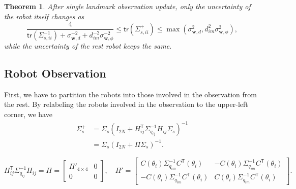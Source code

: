 \documentclass[xcolor=x11names]{article}
\DeclareMathOperator\T{\mathsf{T}}
\newtheorem{theorem}{Theorem}
\begin{document}
    
\begin{theorem}
   After single landmark observation update, only the uncertainty of the robot itself changes as
   \[
    \frac{4}{\mathsf{tr}\left(  \Sigma_{s,ii}^{-1}\right) + \sigma^{-2}_{\mathbf{w},d} + d_{im}^{-2} \sigma^{-2}_{\mathbf{w},\phi}}  \leq \mathsf{tr}\left({\Sigma_{s,ii}^+}  \right) \leq  \max(\sigma^2_{\mathbf{w},d},d_{im}^2 \sigma^2_{\mathbf{w},\phi}),
   \]
   while the uncertainty of the rest robot keeps the same.
\end{theorem}    
    
    
\subsection{Robot Observation}    
    
   First, we have to partition the robots into those involved in the observation from the rest. By relabeling the robots involved in the observation to the upper-left corner, we have
   \begin{align*}
      \Sigma^{+}_s &= \Sigma_s \left( I_{2N} + H_{ij}^{\T} \Sigma_{q_{ij}}^{-1} H_{ij} \Sigma_s   \right)^{-1}\\
          &= \Sigma_s \left( I_{2N} + \Pi \Sigma_s   \right)^{-1}.
   \end{align*}
   
    \begin{equation}
       H_{ij}^{\T} \Sigma_{q_{ij}}^{-1} H_{ij} = \Pi =
         \begin{bmatrix} 
            \Pi'_{4\times 4} & 0\\
             0 & 0
         \end{bmatrix},\quad \Pi' = 
         \begin{bmatrix}
            C(\theta_i) \Sigma_{q_{im}}^{-1} C^{\T}(\theta_i) & -C(\theta_i) \Sigma_{q_{im}}^{-1} C^{\T}(\theta_i) \\
            -C(\theta_i) \Sigma_{q_{im}}^{-1} C^{\T}(\theta_i) & C(\theta_i) \Sigma_{q_{im}}^{-1} C^{\T}(\theta_i)
         \end{bmatrix}.
    \end{equation}    
    
\end{document}
